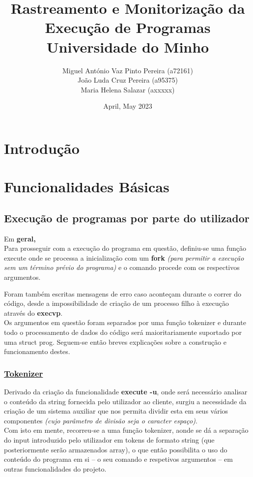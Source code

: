 \documentclass{report}
\title{Rastreamento e Monitorização da Execução de Programas\\
\Large Universidade do Minho}
\author{Miguel António Vaz Pinto Pereira (a72161)\\João Luda Cruz Pereira (a95375)\\ Maria Helena Salazar (axxxxx)}
\date{April, May 2023}
\begin{document}

\maketitle
\section{Introdução}
\lipsum[5]
\newpage

\section{Funcionalidades Básicas}
\subsection{Execução de programas por parte do utilizador}

Em \textbf{geral,}\\

Para prosseguir com a execução do programa em questão, definiu-se uma função execute onde se processa a inicialização com um \textbf{fork} \textit{(para permitir a execução sem um término prévio do programa)} e o comando procede com os respectivos argumentos.\par
Foram também escritas mensagens de erro caso aconteçam durante o correr do código, desde a impossibilidade de criação de um processo filho à execução através do \textbf{execvp}.\\
Os argumentos em questão foram separados por uma função tokenizer e durante todo o processamento de dados do código será maioritariamente suportado por uma struct prog. Seguem-se então breves explicações sobre a construção e funcionamento destes.

\subsubsection{\underline{Tokenizer}}

Derivado da criação da funcionalidade \textbf{execute -u}, onde será necessário analisar o conteúdo da string fornecida pelo utilizador ao cliente, surgiu a necessidade da criação de um sistema auxiliar que nos permita dividir esta em seus vários componentes \textit{(cujo parâmetro de divisão seja o caracter espaço)}.\\
Com isto em mente, recorreu-se a uma função tokenizer, aonde se dá a separação do input introduzido pelo utilizador em tokens de formato string (que posteriormente serão armazenados array), o que então possibilita o uso do conteúdo do programa em si – o seu comando e respetivos argumentos – em outras funcionalidades do projeto.
\end{document}
